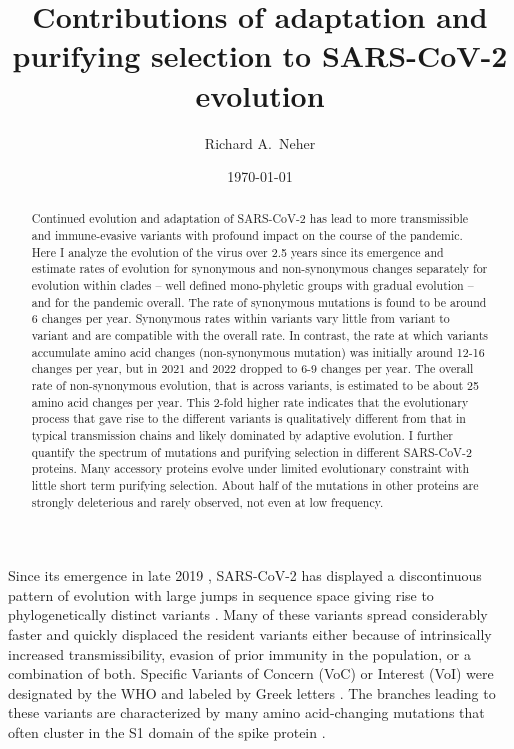 \documentclass[aps,rmp, twocolumn]{revtex4}
\begin{document}
\title{Contributions of adaptation and purifying selection to SARS-CoV-2 evolution}
\author{Richard A.~Neher}
\address{Biozentrum, University of Basel, Basel, Switzerland }
\address{Swiss Institute of Bioinformatics, Switzerland }

\date{\today}

\begin{abstract}
Continued evolution and adaptation of SARS-CoV-2 has lead to more transmissible and immune-evasive variants with profound impact on the course of the pandemic.
Here I analyze the evolution of the virus over 2.5 years since its emergence and estimate rates of evolution for synonymous and non-synonymous changes separately for evolution within clades -- well defined mono-phyletic groups with gradual evolution -- and for the pandemic overall.
The rate of synonymous mutations is found to be around 6 changes per year.
Synonymous rates within variants vary little from variant to variant and are compatible with the overall rate.
In contrast, the rate at which variants accumulate amino acid changes (non-synonymous mutation) was initially around 12-16 changes per year, but in 2021 and 2022 dropped to 6-9 changes per year.
The overall rate of non-synonymous evolution, that is across variants, is estimated to be about 25 amino acid changes per year.
This 2-fold higher rate indicates that the evolutionary process that gave rise to the different variants is qualitatively different from that in typical transmission chains and likely dominated by adaptive evolution.
I further quantify the spectrum of mutations and purifying selection in different SARS-CoV-2 proteins.
Many accessory proteins evolve under limited evolutionary constraint with little short term purifying selection.
About half of the mutations in other proteins are strongly deleterious and rarely observed, not even at low frequency.
\end{abstract}

\maketitle

Since its emergence in late 2019 \citep{zhu_novel_2020}, SARS-CoV-2 has displayed a discontinuous pattern of evolution with large jumps in sequence space giving rise to phylogenetically distinct variants \citep{hodcroft_spread_2021,volz_assessing_2021,tegally_detection_2021,faria_genomics_2021,naveca_covid-19_2021,viana_rapid_2022}.
Many of these variants spread considerably faster and quickly displaced the resident variants either because of intrinsically increased transmissibility, evasion of prior immunity in the population, or a combination of both.
Specific Variants of Concern (VoC) or Interest (VoI) were designated by the WHO and labeled by Greek letters \citep{konings_sars-cov-2_2021}.
The branches leading to these variants are characterized by many amino acid-changing mutations that often cluster in the S1 domain of the spike protein \citep{kistler_rapid_2022}.
\end{document}
